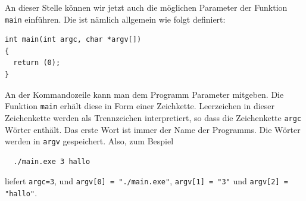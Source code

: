 An dieser Stelle können wir jetzt auch die möglichen Parameter der Funktion \verb|main| einführen.
Die ist nämlich allgemein wie folgt definiert:
\begin{lstlisting}
int main(int argc, char *argv[])
{
  return (0);
}
\end{lstlisting}
An der Kommandozeile kann man dem Programm Parameter mitgeben.
Die Funktion \verb|main| erhält diese in Form einer Zeichkette.
Leerzeichen in dieser Zeichenkette werden als Trennzeichen interpretiert, so dass die Zeichenkette \verb|argc| Wörter enthält.
Das erste Wort ist immer der Name der Programms.
Die Wörter werden in \verb|argv| gespeichert.
Also, zum Bespiel
\begin{verbatim}
  ./main.exe 3 hallo
\end{verbatim}
liefert \verb|argc=3|, und \verb|argv[0] = "./main.exe"|, \verb|argv[1] = "3"| und \verb|argv[2] = "hallo"|.
\newpage
